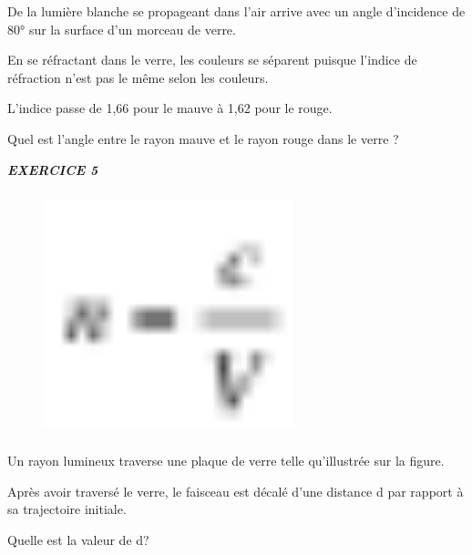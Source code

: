 De la lumière blanche se propageant dans l'air arrive avec un angle
d'incidence de 80° sur la surface d'un morceau de verre.

En se réfractant dans le verre, les couleurs se séparent puisque
l'indice de réfraction n'est pas le même selon les couleurs.

L'indice passe de 1,66 pour le mauve à 1,62 pour le rouge.

Quel est l'angle entre le rayon mauve et le rayon rouge dans le
verre\textbf{ }?

\emph{\textbf{EXERCICE 5}}

\begin{figure}
\centering
\includegraphics[width=7.257cm,height=7.073cm]{Pictures/1000000100000017000000153E95FBDB71A73A78.png}
\caption{}
\end{figure}

Un rayon lumineux traverse une plaque de verre telle qu'illustrée sur la
figure.

Après avoir traversé le verre, le faisceau est décalé d'une distance d
par rapport à sa trajectoire initiale.

Quelle est la valeur de d?

